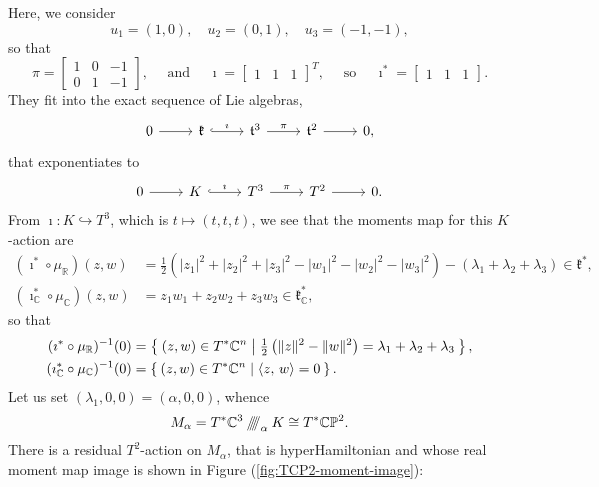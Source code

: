 \documentclass{amsart}
\newcommand{\PP}{\mathbb{P}}
\newcommand{\RR}{\mathbb{R}}
\newcommand{\CC}{\mathbb{C}}
\newcommand{\mfk}{\mathfrak{k}}
\newcommand{\mft}{\mathfrak{t}}
\newcommand{\sssslash}{\mathbin{/\mkern-6mu/\mkern-6mu/\mkern-6mu/}}
\begin{document}
	Here, we consider
	\[
		u_{1} = (1,0), \quad u_{2} = (0,1), \quad u_{3} = (-1,-1),
	\]
	so that
	\[
		\pi = \begin{bmatrix}
			1 & 0 & -1 \\ 0 & 1 & -1
		\end{bmatrix},
		\quad \text{ and } \quad
		\imath = \begin{bmatrix}
			1 & 1 & 1
		\end{bmatrix}^{T},
		\quad \text{ so } \quad
		\imath^{\ast} = \begin{bmatrix}
			1 & 1 & 1
		\end{bmatrix}.
	\]
	They fit into the exact sequence of Lie algebras,
	\[
	\begin{tikzcd}[ampersand replacement=\&]
		0 \ar[r] \&
		\mfk \ar[r, hook, "\imath"] \& \mft^{3} \arrow{r}{\pi} \& \mft^{2} \ar[r] \& 0,
	\end{tikzcd}
	\]
	that exponentiates to
	\[
	\begin{tikzcd}[ampersand replacement=\&]
		0 \ar[r] \&
		K \ar[r, hook, "\imath"] \& T^{3} \arrow{r}{\pi} \& T^{2} \ar[r] \& 0.
	\end{tikzcd}
	\]
	From $\imath : K \hookrightarrow T^{3}$, which is $t \mapsto (t,t,t)$, we see that the moments map for this $K$-action are
	\begin{align*}
		(\imath^{\ast} \circ \mu_{\RR})(z,w) &= \frac{1}{2}\left(|z_{1}|^{2} +|z_{2}|^{2} +|z_{3}|^{2} - |w_{1}|^{2} - |w_{2}|^{2} - |w_{3}|^{2} \right) - (\lambda_{1} + \lambda_{2} + \lambda_{3}) \in \mfk^{\ast}, \\
		(\imath_{\CC}^{\ast} \circ \mu_{\CC})(z,w) &= z_{1}w_{1} + z_{2}w_{2} + z_{3}w_{3} \in \mfk_{\CC}^{\ast},
	\end{align*}
	so that
	\begin{align*}
		(\imath^{\ast} \circ \mu_{\RR})^{-1}(0) &= \Set{(z,w) \in T^{\ast}\CC^{n} | \tfrac{1}{2}\left(\|z\|^{2} - \|w\|^{2} \right) = \lambda_{1} + \lambda_{2} + \lambda_{3}}, \\
		(\imath_{\CC}^{\ast} \circ \mu_{\CC})^{-1}(0) &= \Set{(z,w) \in T^{\ast}\CC^{n} | \langle z,\, w \rangle = 0 }.
	\end{align*}
	Let us set $(\lambda_{1}, 0, 0) = (\alpha, 0, 0)$, whence
	\[
		M_{\alpha} = T^{\ast}\CC^{3} \sssslash_{\alpha} K \cong T^{\ast}\CC\PP^{2}.
	\]
	There is a residual $T^{2}$-action on $M_{\alpha}$, that is hyperHamiltonian and whose real moment map image is shown in Figure (\ref{fig:TCP2-moment-image}):
	
\end{document}
